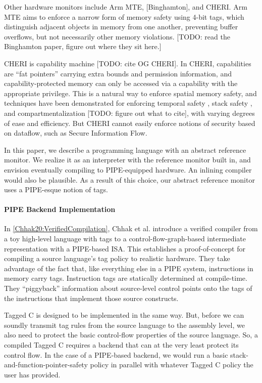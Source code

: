 \documentclass[acmsmall,review,anonymous]{acmart}\settopmatter{printfolios=true,printccs=false,printacmref=false}
\begin{document}
Other hardware monitors include Arm MTE, [Binghamton], and CHERI.
Arm MTE aims to enforce a narrow form of memory safety using 4-bit tags, which distinguish adjacent objects
in memory from one another, preventing buffer overflows, but not necessarily other memory violations.
[TODO: read the Binghamton paper, figure out where they sit here.] 

CHERI is capability machine [TODO: cite OG CHERI]. In CHERI, capabilities
are ``fat pointers'' carrying extra bounds and permission information, and capability-protected
memory can only be accessed via a capability with the appropriate privilege. This is a natural
way to enforce spatial memory safety, and techniques have been demonstrated for enforcing
temporal safety \cite{NWF20:Cornucopia}, stack safety \cite{Skorstengaard19:stktokens},
and compartmentalization [TODO: figure out what to cite], with varying degrees of ease and
efficiency. But CHERI cannot easily enforce notions of security based on dataflow,
such as Secure Information Flow.

In this paper, we describe a programming language with an abstract reference monitor.
We realize it as an interpreter with the reference monitor built in, and envision
eventually compiling to PIPE-equipped hardware. An inlining compiler would also be plausible.
As a result of this choice, our abstract reference monitor uses a PIPE-esque notion of
tags.

\paragraph{PIPE Backend Implementation}

In \cref{Chhak20:VerifiedCompilation}, Chhak et al. introduce a verified compiler from a toy
high-level language with tags
to a control-flow-graph-based intermediate representation with a PIPE-based
ISA. This establishes a proof-of-concept for compiling a source language's tag policy to
realistic hardware. They take advantage of the fact that, like everything else in a PIPE system,
instructions in memory carry tags. Instruction tags are statically determined at compile-time.
They ``piggyback'' information about source-level control points onto the tags of the instructions
that implement those source constructs.

Tagged C is designed to be implemented in the same way. But, before we can soundly transmit
tag rules from the source language to the assembly level, we also need to protect the basic
control-flow properties of the source language. So, a compiled Tagged C requires a backend that
can at the very least protect its control flow. In the case of a PIPE-based backend, we would
run a basic stack-and-function-pointer-safety policy in parallel with whatever Tagged C policy
the user has provided.
\end{document}
